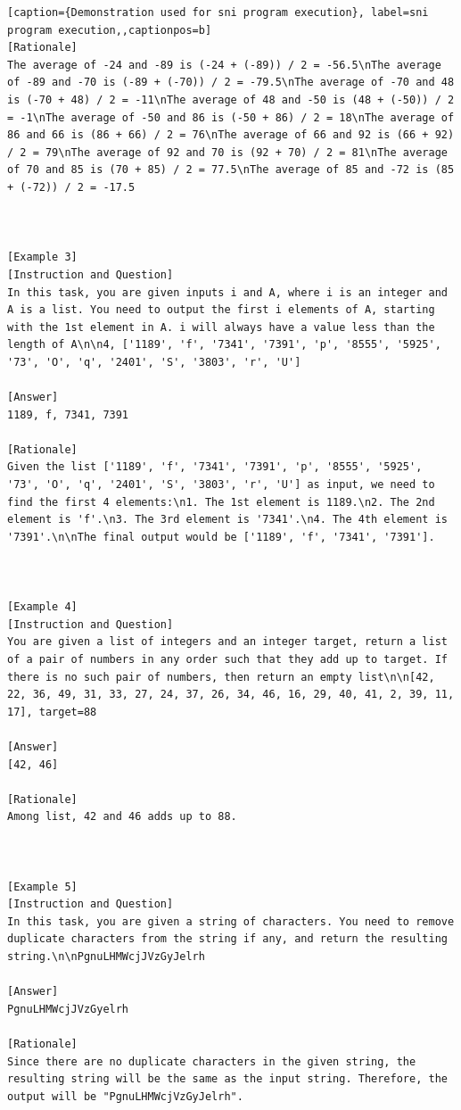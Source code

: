 \begin{lstlisting}[caption={Demonstration used for sni program execution}, label=sni program execution,,captionpos=b]
[Rationale]
The average of -24 and -89 is (-24 + (-89)) / 2 = -56.5\nThe average of -89 and -70 is (-89 + (-70)) / 2 = -79.5\nThe average of -70 and 48 is (-70 + 48) / 2 = -11\nThe average of 48 and -50 is (48 + (-50)) / 2 = -1\nThe average of -50 and 86 is (-50 + 86) / 2 = 18\nThe average of 86 and 66 is (86 + 66) / 2 = 76\nThe average of 66 and 92 is (66 + 92) / 2 = 79\nThe average of 92 and 70 is (92 + 70) / 2 = 81\nThe average of 70 and 85 is (70 + 85) / 2 = 77.5\nThe average of 85 and -72 is (85 + (-72)) / 2 = -17.5



[Example 3]
[Instruction and Question]
In this task, you are given inputs i and A, where i is an integer and A is a list. You need to output the first i elements of A, starting with the 1st element in A. i will always have a value less than the length of A\n\n4, ['1189', 'f', '7341', '7391', 'p', '8555', '5925', '73', 'O', 'q', '2401', 'S', '3803', 'r', 'U']

[Answer]
1189, f, 7341, 7391

[Rationale]
Given the list ['1189', 'f', '7341', '7391', 'p', '8555', '5925', '73', 'O', 'q', '2401', 'S', '3803', 'r', 'U'] as input, we need to find the first 4 elements:\n1. The 1st element is 1189.\n2. The 2nd element is 'f'.\n3. The 3rd element is '7341'.\n4. The 4th element is '7391'.\n\nThe final output would be ['1189', 'f', '7341', '7391'].



[Example 4]
[Instruction and Question]
You are given a list of integers and an integer target, return a list of a pair of numbers in any order such that they add up to target. If there is no such pair of numbers, then return an empty list\n\n[42, 22, 36, 49, 31, 33, 27, 24, 37, 26, 34, 46, 16, 29, 40, 41, 2, 39, 11, 17], target=88

[Answer]
[42, 46]

[Rationale]
Among list, 42 and 46 adds up to 88.



[Example 5]
[Instruction and Question]
In this task, you are given a string of characters. You need to remove duplicate characters from the string if any, and return the resulting string.\n\nPgnuLHMWcjJVzGyJelrh

[Answer]
PgnuLHMWcjJVzGyelrh

[Rationale]
Since there are no duplicate characters in the given string, the resulting string will be the same as the input string. Therefore, the output will be "PgnuLHMWcjVzGyJelrh".




\end{lstlisting}
